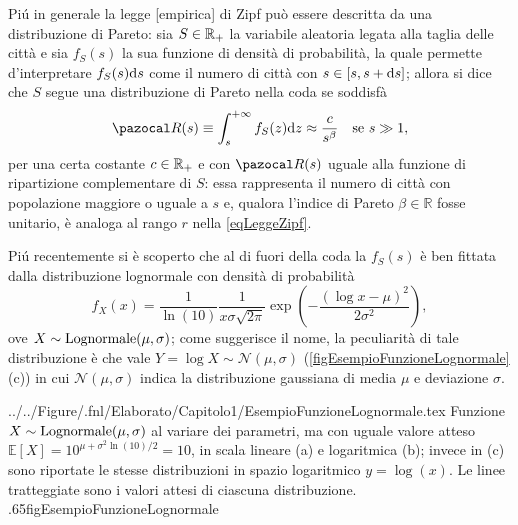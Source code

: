   Piú in generale la legge [empirica] di Zipf può essere descritta da una distribuzione di Pareto: sia \(S\in\mathbb R_+\) la variabile aleatoria legata alla taglia delle città e sia \(f_S(s)\) la sua funzione di densità di probabilità\footnotemark{}, la quale permette d'interpretare \(f_S(s)\mathrm{d} s\) come il numero di città con \(s\in[s,s+\mathrm{d} s]\); allora si dice che \(S\) segue una distribuzione di Pareto nella coda se soddisfà%
  \begin{equation}
    \label{eqFunzioneRipartizioneComplementarePareto}
    \pazocal R(s)\equiv\int_{s}^{+\infty}f_S(z)\de z\approx\frac c{s^\beta}
    \quad\text{se }s\gg1,
  \end{equation}
  per una certa costante \(c\in\mathbb R_+\) e con \(\pazocal R(s)\) uguale alla funzione di ripartizione complementare di \(S\): essa rappresenta il numero di città con popolazione maggiore o uguale a \(s\) e, qualora l'indice di Pareto \(\beta\in\mathbb R\) fosse unitario, è analoga al rango \(r\) nella \eqref{eqLeggeZipf}.

  Piú recentemente \cite{Eeckhout2004,Gualandi2019HBLD} si è scoperto che al di fuori della coda la \(f_S(s)\) è ben fittata dalla distribuzione lognormale con densità di probabilità
  \begin{equation}
    \label{eqDistribuzioneLognormale}
    f_X(x)=\frac1{\ln(10)}\frac1{x\sigma\sqrt{2\pi}}\exp\left( -\frac{(\log x-\mu)^2}{2\sigma^2}\right),
  \end{equation}
  ove \(X\sim\operatorname{Lognormale}(\mu,\sigma)\); come suggerisce il nome, la peculiarità di tale distribuzione è che vale \(Y=\log X\sim\mathcal N(\mu,\sigma)\) (\cref{figEsempioFunzioneLognormale}(c)) in cui \(\mathcal N(\mu,\sigma)\) indica la distribuzione gaussiana di media \(\mu\) e deviazione \(\sigma\).

    {../../Figure/.fnl/Elaborato/Capitolo1/EsempioFunzioneLognormale.tex}
    {Funzione \(X\sim\operatorname{Lognormale}(\mu,\sigma)\) al variare dei parametri, ma con uguale valore atteso \(\mathbb E[X]=10^{\mu+\sigma^2\ln(10)/2}=10\), in scala lineare (a) e logaritmica (b); invece in (c) sono riportate le stesse distribuzioni in spazio logaritmico \(y=\log(x)\). Le linee tratteggiate sono i valori attesi di ciascuna distribuzione.}
    {.65\linewidth}{figEsempioFunzioneLognormale}

